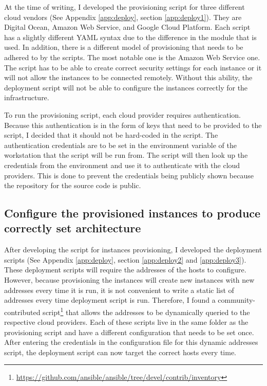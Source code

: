 At the time of writing, I developed the provisioning script for three different cloud vendors (See Appendix \ref{app:deploy}, section \ref{app:deploy1}). They are Digital Ocean, Amazon Web Service, and Google Cloud Platform. Each script has a slightly different YAML syntax due to the difference in the module that is used. In addition, there is a different model of provisioning that needs to be adhered to by the scripts. The most notable one is the Amazon Web Service one. The script has to be able to create correct security settings for each instance or it will not allow the instances to be connected remotely. Without this ability, the deployment script will not be able to configure the instances correctly for the infrastructure.

To run the provisioning script, each cloud provider requires authentication. Because this authentication is in the form of keys that need to be provided to the script, I decided that it should not be hard-coded in the script. The authentication credentials are to be set in the environment variable of the workstation that the script will be run from. The script will then look up the credentials from the environment and use it to authenticate with the cloud providers. This is done to prevent the credentials being publicly shown because the repository for the source code is public.

\subsection{Configure the provisioned instances to produce correctly set architecture}

After developing the script for instances provisioning, I developed the deployment scripts (See Appendix \ref{app:deploy}, section \ref{app:deploy2} and \ref{app:deploy3}). These deployment scripts will require the addresses of the hosts to configure. However, because provisioning the instances will create new instances with new addresses every time it is run, it is not convenient to write a static list of addresses every time deployment script is run. Therefore, I found a community-contributed script\footnote{\url{https://github.com/ansible/ansible/tree/devel/contrib/inventory}} that allows the addresses to be dynamically queried to the respective cloud providers. Each of these scripts live in the same folder as the provisioning script and have a different configuration that needs to be set once. After entering the credentials in the configuration file for this dynamic addresses script, the deployment script can now target the correct hosts every time.

